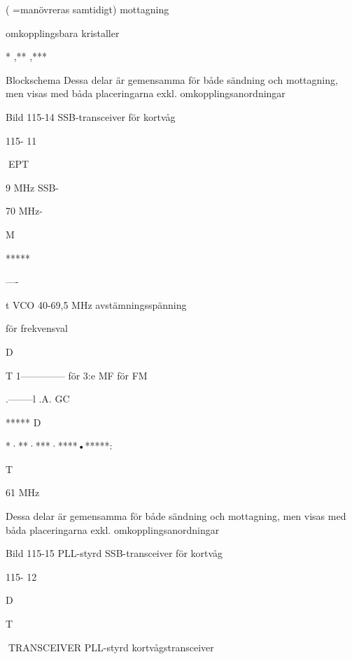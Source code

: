 {( =manövreras samtidigt)
mottagning

omkopplingsbara
kristaller

* ,** ,***

Blockschema
Dessa delar är gemensamma för både sändning och mottagning, men visas med
båda placeringarna exkl. omkopplingsanordningar

Bild 115-14 SSB-transceiver för kortvåg

115- 11

EPT

9 MHz
SSB-

70 MHz-

M

*****

----

t
VCO 40-69,5 MHz
avstämningsspänning

för frekvensval

D

T
1-------------- för 3:e MF för FM

.--------l .A. GC

*****
D

*·**·***·****•*****:

T

61 MHz

Dessa delar är gemensamma för både sändning och mottagning, men visas med
båda placeringarna exkl. omkopplingsanordningar

Bild 115-15 PLL-styrd SSB-transceiver för kortvåg

115- 12

D

T

TRANSCEIVER
PLL-styrd kortvågstransceiver

}
